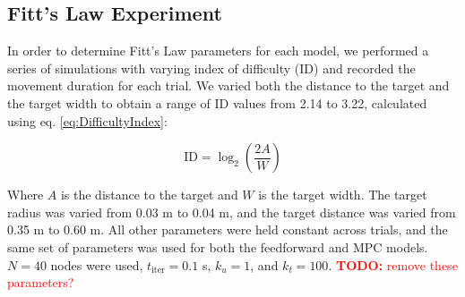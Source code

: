 \documentclass[letterpaper, 10pt, conference]{ieeeconf}
\newcommand{\todo}[1]{\textcolor{red}{\textbf{TODO:} #1}}
\begin{document}

\subsection{Fitt's Law Experiment}


In order to determine Fitt's Law parameters for each model, we performed a series of simulations with varying index of difficulty (ID) and recorded the movement duration for each trial.
We varied both the distance to the target and the target width to obtain a range of ID values from 2.14 to 3.22, calculated using eq. \ref{eq:DifficultyIndex}:

\begin{equation}
    \text{ID} = \log_2 \left(\frac{2A}{W}\right) \label{eq:DifficultyIndex}
\end{equation}

Where $A$ is the distance to the target and $W$ is the target width.
The target radius was varied from 0.03 m to 0.04 m, and the target distance was varied from 0.35 m to 0.60 m.
All other parameters were held constant across trials, and the same set of parameters was used for both the feedforward and MPC models.
$N = 40$ nodes were used, $t_{\text{iter}} = 0.1$ s, $k_u = 1$, and $k_t = 100$. \todo{remove these parameters?}
\end{document}
